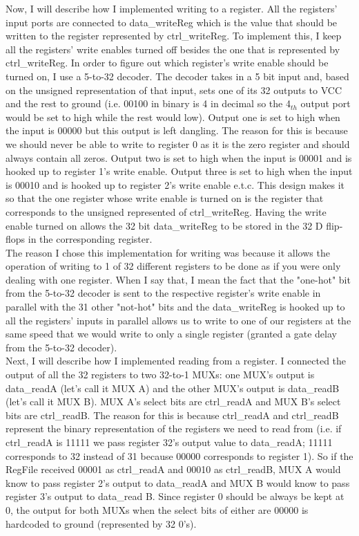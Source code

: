 \documentclass[letterpaper]{article} %
\begin{document}
    Now, I will describe how I implemented writing to a register. All the registers' input ports are connected to data\_writeReg which is the value that should be written to the register represented by ctrl\_writeReg. To implement this, I keep all the registers' write enables turned off besides the one that is represented by ctrl\_writeReg. In order to figure out which register's write enable should be turned on, I use a 5-to-32 decoder. The decoder takes in a 5 bit input and, based on the unsigned representation of that input, sets one of its 32 outputs to VCC and the rest to ground (i.e. 00100 in binary is 4 in decimal so the 4$_{th}$ output port would be set to high while the rest would low). Output one is set to high when the input is 00000 but this output is left dangling. The reason for this is because we should never be able to write to register 0 as it is the zero register and should always contain all zeros. Output two is set to high when the input is 00001 and is hooked up to register 1's write enable. Output three is set to high when the input is 00010 and is hooked up to register 2's write enable e.t.c. This design makes it so that the one register whose write enable is turned on is the register that corresponds to the unsigned represented of ctrl\_writeReg. Having the write enable turned on allows the 32 bit data\_writeReg to be stored in the 32 D flip-flops in the corresponding register. \\
    
    The reason I chose this implementation for writing was because it allows the operation of writing to 1 of 32 different registers to be done as if you were only dealing with one register. When I say that, I mean the fact that the "one-hot" bit from the 5-to-32 decoder is sent to the respective register's write enable in parallel with the 31 other "not-hot" bits and the data\_writeReg is hooked up to all the registers' inputs in parallel allows us to write to one of our registers at the same speed that we would write to only a single register (granted a gate delay from the 5-to-32 decoder). \\
    
    Next, I will describe how I implemented reading from a register. I connected the output of all the 32 registers to two 32-to-1 MUXs: one MUX's output is data\_readA (let's call it MUX A) and the other MUX's output is data\_readB (let's call it MUX B). MUX A's select bits are ctrl\_readA and MUX B's select bits are ctrl\_readB. The reason for this is because ctrl\_readA and ctrl\_readB represent the binary representation of the registers we need to read from (i.e. if ctrl\_readA is 11111 we pass register 32's output value to data\_readA; 11111 corresponds to 32 instead of 31 because 00000 corresponds to register 1). So if the RegFile received 00001 as ctrl\_readA and 00010 as ctrl\_readB, MUX A would know to pass register 2's output to data\_readA and MUX B would know to pass register 3's output to data\_read B. Since register 0 should be always be kept at 0, the output for both MUXs when the select bits of either are 00000 is hardcoded to ground (represented by 32 0's). \\ 
    
\end{document}
